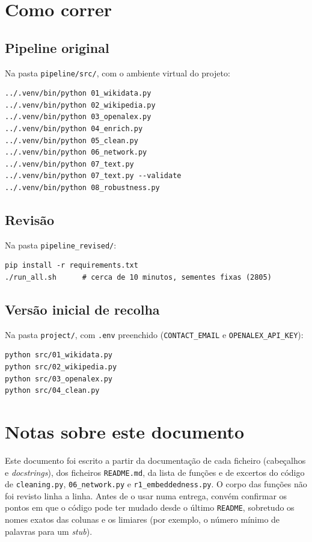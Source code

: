 \documentclass[11pt,a4paper]{article}
\newcommand{\file}[1]{\texttt{#1}}
\begin{document}
\section{Como correr}

\subsection{Pipeline original}

Na pasta \file{pipeline/src/}, com o ambiente virtual do projeto:
\begin{verbatim}
../.venv/bin/python 01_wikidata.py
../.venv/bin/python 02_wikipedia.py
../.venv/bin/python 03_openalex.py
../.venv/bin/python 04_enrich.py
../.venv/bin/python 05_clean.py
../.venv/bin/python 06_network.py
../.venv/bin/python 07_text.py
../.venv/bin/python 07_text.py --validate
../.venv/bin/python 08_robustness.py
\end{verbatim}

\subsection{Revisão}

Na pasta \file{pipeline_revised/}:
\begin{verbatim}
pip install -r requirements.txt
./run_all.sh      # cerca de 10 minutos, sementes fixas (2805)
\end{verbatim}

\subsection{Versão inicial de recolha}

Na pasta \file{project/}, com \file{.env} preenchido (\texttt{CONTACT\_EMAIL} e \texttt{OPENALEX\_API\_KEY}):
\begin{verbatim}
python src/01_wikidata.py
python src/02_wikipedia.py
python src/03_openalex.py
python src/04_clean.py
\end{verbatim}

\section{Notas sobre este documento}

Este documento foi escrito a partir da documentação de cada ficheiro (cabeçalhos e \emph{docstrings}), dos ficheiros \file{README.md}, da lista de funções e de excertos do código de \file{cleaning.py}, \file{06_network.py} e \file{r1_embeddedness.py}. O corpo das funções não foi revisto linha a linha. Antes de o usar numa entrega, convém confirmar os pontos em que o código pode ter mudado desde o último \texttt{README}, sobretudo os nomes exatos das colunas e os limiares (por exemplo, o número mínimo de palavras para um \emph{stub}).
\end{document}
